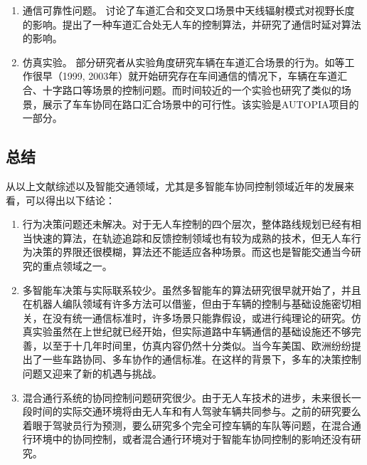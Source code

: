 \begin{enumerate}[wide=\parindent]
\begin{enumerate}[label=(\arabic*),wide=\parindent]
\item 通信可靠性问题。
\cite{Abbas2013Radio}讨论了车道汇合和交叉口场景中天线辐射模式对视野长度的影响。提出了一种车道汇合处无人车的控制算法，并研究了通信时延对算法的影响。

\item 仿真实验。
部分研究者从实验角度研究车辆在车道汇合场景的行为。如等工作很早（1999, 2003年）就开始研究存在车间通信的情况下，车辆在车道汇合、十字路口等场景的控制问题。而时间较近的一个实验\cite{Milanes2011Automated}也研究了类似的场景，展示了车车协同在路口汇合场景中的可行性。该实验是AUTOPIA\cite{Milan2011AUTOPIA}项目的一部分。
\end{enumerate}

\subsection{总结}
\label{ssec:intro:summary}
从以上文献综述以及智能交通领域，尤其是多智能车协同控制领域近年的发展来看，可以得出以下结论：

\begin{enumerate}[label=(\arabic*),wide=\parindent]
\item 行为决策问题还未解决。对于无人车控制的四个层次，整体路线规划已经有相当快速的算法，在轨迹追踪和反馈控制领域也有较为成熟的技术，但无人车行为决策的界限还很模糊，算法还不能适应各种场景。而这也是智能交通当今研究的重点领域之一。
\item 多智能车决策与实际联系较少。虽然多智能车的算法研究很早就开始了，并且在机器人编队领域有许多方法可以借鉴，但由于车辆的控制与基础设施密切相关，在没有统一通信标准时，许多场景只能靠假设，或进行纯理论的研究。仿真实验虽然在上世纪就已经开始，但实际道路中车辆通信的基础设施还不够完善，以至于十几年时间里，仿真内容仍然十分类似。当今车美国、欧洲纷纷提出了一些车路协同、多车协作的通信标准\cite{Chen2014Cooperative}。在这样的背景下，多车的决策控制问题又迎来了新的机遇与挑战。
\item 混合通行系统的协同控制问题研究很少。由于无人车技术的进步，未来很长一段时间的实际交通环境将由无人车和有人驾驶车辆共同参与。之前的研究要么着眼于驾驶员行为预测，要么研究多个完全可控车辆的车队等问题，在混合通行环境中的协同控制，或者混合通行环境对于智能车协同控制的影响还没有研究。
\end{enumerate}

\end{enumerate}

